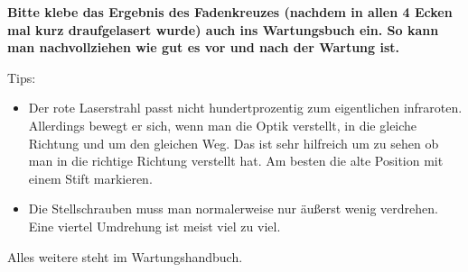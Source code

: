 \documentclass{\basedir/fablab-document}
\begin{document}
\textbf{Bitte klebe das Ergebnis des Fadenkreuzes (nachdem in allen 4 Ecken mal kurz draufgelasert wurde) auch ins Wartungsbuch ein. So kann man nachvollziehen wie gut es vor und nach der Wartung ist.}

Tips:
\begin{itemize}
	\item Der rote Laserstrahl passt nicht hundertprozentig zum eigentlichen infraroten. Allerdings bewegt er sich, wenn man die Optik verstellt, in die gleiche Richtung und um den gleichen Weg. Das ist sehr hilfreich um zu sehen ob man in die richtige Richtung verstellt hat. Am besten die alte Position mit einem Stift markieren.

	\item Die Stellschrauben muss man normalerweise nur äußerst wenig verdrehen. Eine viertel Umdrehung ist meist viel zu viel.
\end{itemize}

Alles weitere steht im Wartungshandbuch.
\end{document}
